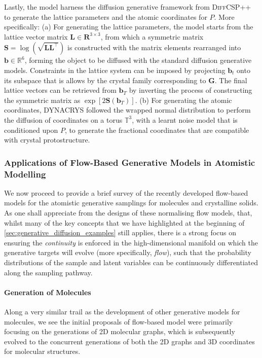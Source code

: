 Lastly, the model harness the diffusion generative framework from \textsc{DiffCSP}++\cite{jiao2024space} to generate the lattice parameters and the atomic coordinates for $P$. More specifically: (a) For generating the lattice parameters, the model starts from the lattice vector matrix $\bm{L}\in\bm{R}^{3\times3}$, from which a symmetric matrix $\bm{S}=\log(\sqrt{\bm{L}\bm{L}^\top})$ is constructed with the  matrix elements rearranged into $\bm{b}\in\mathbb{R}^6$, forming the object to be diffused with the standard diffusion generative models. Constraints in the lattice system can be imposed by projecting $\bm{b}_t$ onto its subspace that is allows by the crystal family corresponding to $\bm{G}$. The final lattice vectors can be retrieved from $\bm{b}_T$ by inverting the process of constructing the symmetric matrix as $\exp[2\bm{S}(\bm{b}_T)]$. (b) For generating the atomic coordinates,  \textsc{DYNACRYS} followed the wrapped normal distribution to perform the diffusion of coordinates on a torus $\mathbb{T}^3$, with a learnt noise model that is conditioned upon $P$, to generate the fractional coordinates that are compatible with crystal protostructure.



\subsubsection{Applications of Flow-Based Generative Models in Atomistic Modelling}
\label{sec:generative_flow_examples}

We now proceed to provide a brief survey of the recently developed flow-based  models for the atomistic generative samplings for molecules and crystalline solids. As one shall appreciate from the designs of these  normalising flow models, that, whilst many of the key concepts that we have highlighted at the beginning of  \cref{sec:generative_diffusion_examples} still applies, there is a strong focus on ensuring the \emph{continuity} is enforced in the high-dimensional manifold on which the generative targets will evolve (more specifically, \emph{flow}), such that the probability distributions of the sample and latent variables can be continuously differentiated along the sampling pathway. 

\paragraph{\textbf{Generation of Molecules}} Along a very similar trail as the development of other generative models for molecules, we see the initial proposals of flow-based model were primarily focusing on the generations of 2D molecular graphs, which is subsequently evolved to the concurrent generations of both the 2D graphs and 3D coordinates for molecular structures.

